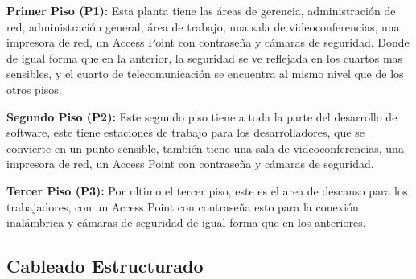 \documentclass[letterpaper,11pt]{article}
\begin{document}
    \textbf{Primer Piso (P1):} Esta planta tiene las áreas de gerencia, administración de red, administración general, 
    área de trabajo, una sala de videoconferencias, una impresora de red, un Access Point con contraseña y cámaras de seguridad. 
    Donde de igual forma que en la anterior, la seguridad se ve reflejada en los cuartos mas sensibles, y el cuarto de telecomunicación 
    se encuentra al mismo nivel que de los otros pisos.

    \textbf{Segundo Piso (P2):} Este segundo piso tiene a toda la parte del desarrollo de software, este tiene
    estaciones de trabajo para los desarrolladores, que se convierte en un punto sensible, también tiene 
    una sala de videoconferencias, una impresora de red, un Access Point con contraseña y cámaras de seguridad. 

    \textbf{Tercer Piso (P3):} Por ultimo el tercer piso, este es el area de descanso para los trabajadores, 
    con un Access Point con contraseña esto para la conexión inalámbrica y cámaras de seguridad de igual forma que en los anteriores.

    \subsection{Cableado Estructurado}
\end{document}
